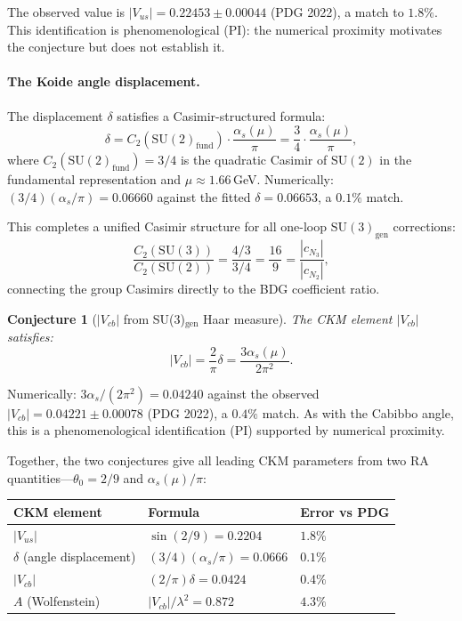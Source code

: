 \documentclass[11pt]{article}
\newtheorem{conjecture}{Conjecture}
\begin{document}
The observed value is $|V_{us}|=0.22453\pm 0.00044$ (PDG 2022), a match to $1.8\%$. This identification is phenomenological (PI): the numerical proximity motivates the conjecture but does not establish it.

\paragraph{The Koide angle displacement.} The displacement $\delta$ satisfies a Casimir-structured formula:
\begin{equation}
\delta = C_2(\mathrm{SU}(2)_{\mathrm{fund}})\cdot\frac{\alpha_s(\mu)}{\pi} = \frac{3}{4}\cdot\frac{\alpha_s(\mu)}{\pi},
\end{equation}
where $C_2(\mathrm{SU}(2)_{\mathrm{fund}})=3/4$ is the quadratic Casimir of $\mathrm{SU}(2)$ in the fundamental representation and $\mu\approx 1.66$\,GeV. Numerically: $(3/4)(\alpha_s/\pi)=0.06660$ against the fitted $\delta=0.06653$, a $0.1\%$ match.

This completes a unified Casimir structure for all one-loop $\mathrm{SU}(3)_{\mathrm{gen}}$ corrections:
\begin{equation}
\frac{C_2(\mathrm{SU}(3))}{C_2(\mathrm{SU}(2))} = \frac{4/3}{3/4} = \frac{16}{9} = \frac{|c_{N_3}|}{|c_{N_2}|},
\end{equation}
connecting the group Casimirs directly to the BDG coefficient ratio.

\begin{conjecture}[$|V_{cb}|$ from SU(3)$_{\mathrm{gen}}$ Haar measure]
\label{conj:vcb}
The CKM element $|V_{cb}|$ satisfies:
\begin{equation}
|V_{cb}| = \frac{2}{\pi}\delta = \frac{3\alpha_s(\mu)}{2\pi^2}.
\end{equation}
\end{conjecture}

Numerically: $3\alpha_s/(2\pi^2)=0.04240$ against the observed $|V_{cb}|=0.04221\pm 0.00078$ (PDG 2022), a $0.4\%$ match. As with the Cabibbo angle, this is a phenomenological identification (PI) supported by numerical proximity.

Together, the two conjectures give all leading CKM parameters from two RA quantities---$\theta_0=2/9$ and $\alpha_s(\mu)/\pi$:
\begin{center}
\begin{tabular}{lll}
\toprule
CKM element & Formula & Error vs PDG \\
\midrule
$|V_{us}|$ & $\sin(2/9)=0.2204$ & $1.8\%$ \\
$\delta$ (angle displacement) & $(3/4)(\alpha_s/\pi)=0.0666$ & $0.1\%$ \\
$|V_{cb}|$ & $(2/\pi)\delta=0.0424$ & $0.4\%$ \\
$A$ (Wolfenstein) & $|V_{cb}|/\lambda^2=0.872$ & $4.3\%$ \\
\bottomrule
\end{tabular}
\end{center}
\end{document}
